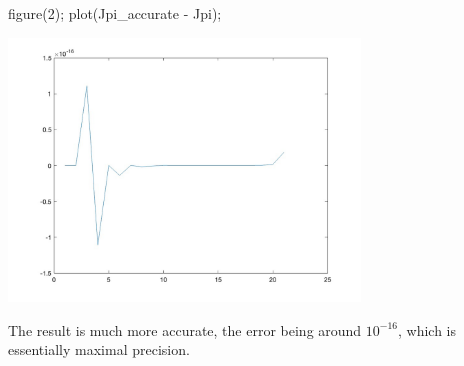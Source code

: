 \documentclass{homework}
\begin{document}
\begin{problem}
\begin{matlab}
figure(2);
plot(Jpi_accurate - Jpi);
\end{matlab}
\begin{center}
\includegraphics[width=0.7\textwidth]{Hw1-Fig2.jpg}
\end{center}
The result is much more accurate, the error
being around \(10^{-16}\), which is essentially
maximal precision.
\end{problem}
\end{document}
